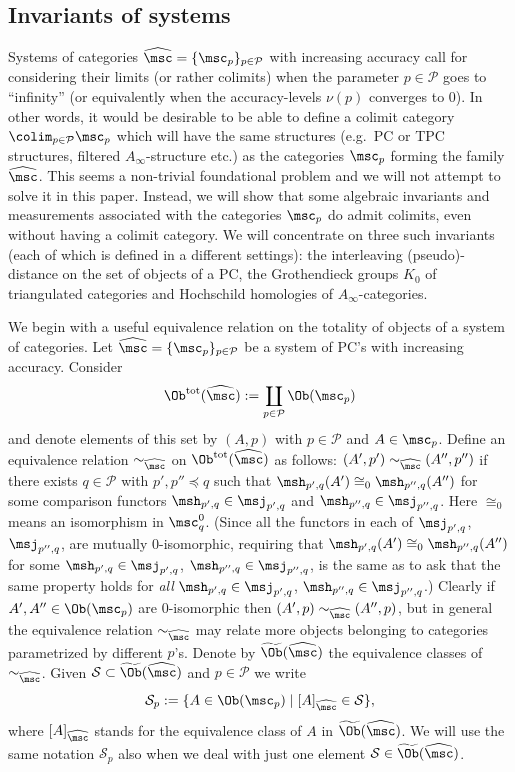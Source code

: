 \subsection{Invariants of systems} \label{sb:sys-inv} Systems of
categories $\widehat{\msc} = \{\msc_p\}_{p \in \mathcal{P}}$ with
increasing accuracy call for considering their limits (or rather
colimits) when the parameter $p \in \mathcal{P}$ goes to ``infinity''
(or equivalently when the accuracy-levels $\nu(p)$ converges to
$0$). In other words, it would be desirable to be able to define a
colimit category $\colim_{p \in \mathcal{P}} \msc_p$ which will have
the same structures (e.g.~PC or TPC structures, filtered
$A_{\infty}$-structure etc.) as the categories $\msc_p$ forming the
family $\widehat{\msc}$. This seems a non-trivial foundational problem
and we will not attempt to solve it in this paper. Instead, we will
show that some algebraic invariants and measurements associated with
the categories $\msc_p$ do admit colimits, even without having a
colimit category. We will concentrate on three such invariants (each
of which is defined in a different settings): the interleaving
(pseudo)-distance on the set of objects of a PC, the Grothendieck
groups $K_0$ of triangulated categories and Hochschild homologies of
$A_{\infty}$-categories.

We begin with a useful equivalence relation on the totality of
  objects of a system of categories.  \label{p:equiv-ob} Let
  $\widehat{\msc} = \{\msc_p\}_{p \in \mathcal{P}}$ be a system of
  PC's with increasing accuracy. Consider
  $$\Ob^{\text{tot}}(\widehat{\msc}) := \coprod_{p\in \mathcal{P}}
  \Ob(\msc_p)$$ and denote elements of this set by $(A,p)$ with
  $p \in \mathcal{P}$ and $A \in \msc_p$. Define an equivalence
  relation $\sim_{\widehat{\msc}}$ on
  $\Ob^{\text{tot}}(\widehat{\msc})$ as follows:
  $(A', p') \sim_{\widehat{\msc}} (A'', p'')$ if there exists
  $q \in \mathcal{P}$ with $p',p'' \preceq q$ such that
  $\msh_{p',q}(A') \cong_0 \msh_{p'',q}(A'')$ for some comparison
  functors $\msh_{p',q} \in \msj_{p',q}$ and
  $\msh_{p'',q} \in \msj_{p'',q}$. Here $\cong_0$ means an isomorphism
  in $\msc_q^0$. (Since all the functors in each of $\msj_{p',q}$,
  $\msj_{p'',q}$, are mutually $0$-isomorphic, requiring that
  $\msh_{p',q}(A') \cong_0 \msh_{p'',q}(A'')$ for some
  $\msh_{p',q} \in \msj_{p',q}$, $\msh_{p'',q} \in \msj_{p'',q}$, is
  the same as to ask that the same property holds for {\em all}
  $\msh_{p',q} \in \msj_{p',q}$, $\msh_{p'',q} \in \msj_{p'',q}$.)
  Clearly if $A', A'' \in \Ob(\msc_p)$ are $0$-isomorphic then
  $(A', p) \sim_{\widehat{\msc}} (A'',p)$, but in general the
  equivalence relation $\sim_{\widehat{\msc}}$ may relate more objects
  belonging to categories parametrized by different $p$'s.
Denote by $\widetilde{\Ob}(\widehat{\msc})$ the equivalence
  classes of $\sim_{\widehat{\msc}}$.  Given
  $\mathcal{S} \subset \widetilde{\Ob}(\widehat{\msc})$ and
  $p \in \mathcal{P}$ we write
$$\mathcal{S}_p := \{ A \in \Ob(\msc_p) \mid [A]_{\widehat{\msc}}
\in \mathcal{S}\},$$ where $[A]_{\widehat{\msc}}$ stands for the
equivalence class of $A$ in $\widetilde{\Ob}(\widehat{\msc})$.  We
will use the same notation $\mathcal{S}_p$ also when we deal with just
one element $\mathcal{S} \in \widetilde{\Ob}(\widehat{\msc})$.

